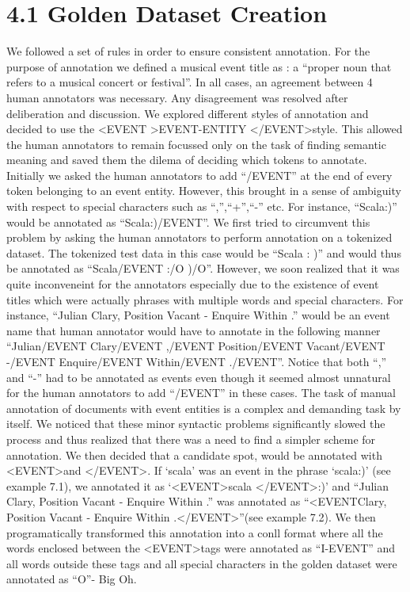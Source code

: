 \documentclass[a4paper,11pt]{report}
\begin{document}
\section*{4.1 Golden Dataset Creation}
We followed a set of rules in order to ensure consistent annotation. For the purpose of annotation we defined a musical event title as : a ``proper noun that refers to a musical concert or festival''. In all cases, an agreement between 4 human annotators was necessary. Any disagreement was resolved after deliberation and discussion. We explored different styles of annotation and decided to use the  \textless EVENT \textgreater EVENT-ENTITY \textless /EVENT\textgreater style. This allowed the human annotators to remain focussed only on the task of finding semantic meaning and saved them the dilema of deciding which tokens to annotate. Initially we asked the human annotators to add ``/EVENT'' at the end of every token belonging to an event entity. However, this brought in a sense of ambiguity with respect to special characters such as ``,'',``+'',``-'' etc. For instance, ``Scala:)'' would be annotated as ``Scala:)/EVENT''. We first tried to circumvent this problem by asking the human annotators to perform annotation on a tokenized dataset. The tokenized test data in this case would be ``Scala : )'' and would thus be annotated as ``Scala/EVENT :/O )/O''. However, we soon realized that it was quite inconveneint for the annotators especially due to the existence of event titles which were actually phrases with multiple words and special characters. For instance, ``Julian Clary, Position Vacant - Enquire Within .'' would be an event name that human annotator would have to annotate in the following manner ``Julian/EVENT Clary/EVENT ,/EVENT Position/EVENT Vacant/EVENT -/EVENT Enquire/EVENT Within/EVENT ./EVENT''. Notice that both ``,'' and ``-'' had to be annotated as events even though it seemed almost unnatural for the human annotators to add ``/EVENT'' in these cases. The task of manual annotation of documents with event entities is a complex and demanding task by itself. We noticed that these minor syntactic problems significantly slowed the process and thus realized that there was a need to find a simpler scheme for annotation. We then decided that a candidate spot, would be annotated with \textless EVENT\textgreater and \textless /EVENT\textgreater. If `scala' was an event in the phrase `scala:)' (see example 7.1), we annotated it as `\textless EVENT\textgreater scala \textless /EVENT\textgreater :)' and ``Julian Clary, Position Vacant - Enquire Within .'' was annotated as ``\textless EVENT\textgreaterJulian Clary, Position Vacant - Enquire Within .\textless /EVENT\textgreater ''(see example 7.2). We then programatically transformed this annotation into a conll format where all the words enclosed between the \textless EVENT\textgreater tags were annotated as ``I-EVENT'' and all words outside these tags and all special characters in the golden dataset were annotated as ``O''- Big Oh. \newline
\end{document}
